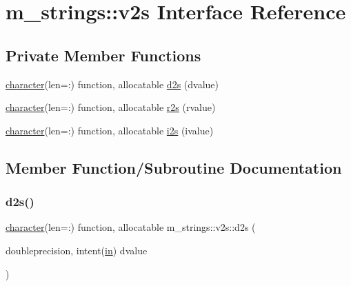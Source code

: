 \hypertarget{interfacem__strings_1_1v2s}{}\section{m\+\_\+strings\+:\+:v2s Interface Reference}
\label{interfacem__strings_1_1v2s}
\subsection*{Private Member Functions}
\begin{DoxyCompactItemize}
\item 
\hyperlink{option__stopwatch_83_8txt_abd4b21fbbd175834027b5224bfe97e66}{character}(len=\+:) function, allocatable \hyperlink{interfacem__strings_1_1v2s_adfd5e1edc68c2af661a36617d19a35fa}{d2s} (dvalue)
\item 
\hyperlink{option__stopwatch_83_8txt_abd4b21fbbd175834027b5224bfe97e66}{character}(len=\+:) function, allocatable \hyperlink{interfacem__strings_1_1v2s_a207ea79b86bbc61c1336a9ce92d8e24d}{r2s} (rvalue)
\item 
\hyperlink{option__stopwatch_83_8txt_abd4b21fbbd175834027b5224bfe97e66}{character}(len=\+:) function, allocatable \hyperlink{interfacem__strings_1_1v2s_a08eee3b78b507ff8e07060cea394e87d}{i2s} (ivalue)
\end{DoxyCompactItemize}


\subsection{Member Function/\+Subroutine Documentation}
\mbox{\label{interfacem__strings_1_1v2s_adfd5e1edc68c2af661a36617d19a35fa}} 
\subsubsection{\texorpdfstring{d2s()}{d2s()}}
{\footnotesize\ttfamily \hyperlink{option__stopwatch_83_8txt_abd4b21fbbd175834027b5224bfe97e66}{character}(len=\+:) function, allocatable m\+\_\+strings\+::v2s\+::d2s (\begin{DoxyParamCaption}\item[{doubleprecision, intent(\hyperlink{M__journal_83_8txt_afce72651d1eed785a2132bee863b2f38}{in})}]{dvalue }\end{DoxyParamCaption})\hspace{0.3cm}{\ttfamily [private]}}

